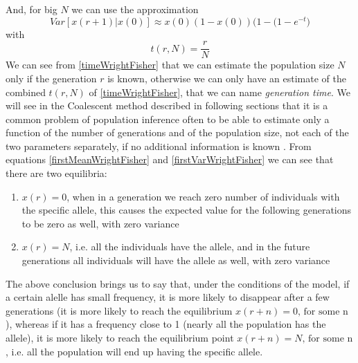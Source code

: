 \documentclass[12pt,mythesisstyle]{report}
\begin{document}
And, for big $N$ we can use the approximation
\begin{equation}\label{approxVarWrightFisher}
Var[x(r+1)|x(0)]\approx x(0)(1-x(0))\bigg(1-\bigg(1-e^{-t}\bigg)
\end{equation}
with
\begin{equation}\label{timeWrightFisher}
t(r, N)=\frac{r}{N}
\end{equation} 
We can see from \eqref{timeWrightFisher} that we can estimate the population size $N$ only if the generation $r$ is known, otherwise we can only have an estimate of the combined $t(r,N)$ of \eqref{timeWrightFisher}, that we can name \textit{generation time}. We will see in the Coalescent method described in following sections that it is a common problem of population inference often to be able to estimate only a function of the number of generations and of the population size, not each of the two parameters separately, if no additional information is known \cite{wrightexplained} \cite{drummondestimatepopsize}.
From equations \eqref{firstMeanWrightFisher} and \eqref{firstVarWrightFisher} we can see that there are two equilibria:
\begin{enumerate}
	\item $x(r)=0$, when in a generation we reach zero number of individuals with the specific allele, this causes the expected value for the following generations to be zero as well, with zero variance
	\item $x(r)=N$, i.e. all the individuals have the allele, and in the future generations all individuals will have the allele as well, with zero variance
\end{enumerate}
The above conclusion brings us to say that, under the conditions of the model, if a certain alelle has small frequency, it is more likely to disappear after a few generations (it is more likely to reach the equilibrium $x(r+n)=0 \text{, for some n}$), whereas if it has a frequency close to 1 (nearly all the population has the allele), it is more likely to reach the equilibrium point $x(r+n)=N \text{, for some n}$, i.e. all the population will end up having the specific allele.
\end{document}
